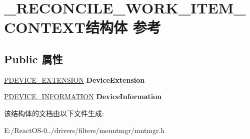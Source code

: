 \hypertarget{struct___r_e_c_o_n_c_i_l_e___w_o_r_k___i_t_e_m___c_o_n_t_e_x_t}{}\section{\+\_\+\+R\+E\+C\+O\+N\+C\+I\+L\+E\+\_\+\+W\+O\+R\+K\+\_\+\+I\+T\+E\+M\+\_\+\+C\+O\+N\+T\+E\+X\+T结构体 参考}
\label{struct___r_e_c_o_n_c_i_l_e___w_o_r_k___i_t_e_m___c_o_n_t_e_x_t}
\subsection*{Public 属性}
\begin{DoxyCompactItemize}
\item 
\mbox{\label{struct___r_e_c_o_n_c_i_l_e___w_o_r_k___i_t_e_m___c_o_n_t_e_x_t_ac6212e1ec86dd0a7c5ec513cb688dfd1}} 
\hyperlink{struct___b_e_e_p___d_e_v_i_c_e___e_x_t_e_n_s_i_o_n}{P\+D\+E\+V\+I\+C\+E\+\_\+\+E\+X\+T\+E\+N\+S\+I\+ON} {\bfseries Device\+Extension}
\item 
\mbox{\label{struct___r_e_c_o_n_c_i_l_e___w_o_r_k___i_t_e_m___c_o_n_t_e_x_t_a1349b9a602ff803f50987508d5fabf88}} 
\hyperlink{struct___d_e_v_i_c_e___i_n_f_o_r_m_a_t_i_o_n}{P\+D\+E\+V\+I\+C\+E\+\_\+\+I\+N\+F\+O\+R\+M\+A\+T\+I\+ON} {\bfseries Device\+Information}
\end{DoxyCompactItemize}


该结构体的文档由以下文件生成\+:\begin{DoxyCompactItemize}
\item 
E\+:/\+React\+O\+S-\/0../drivers/filters/mountmgr/mntmgr.\+h\end{DoxyCompactItemize}
